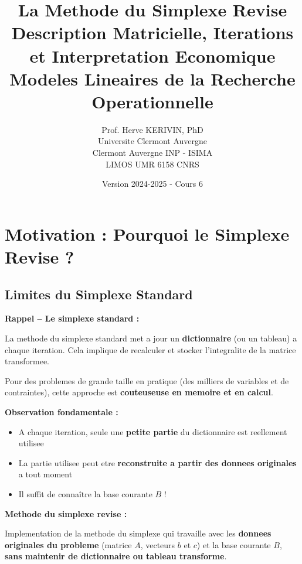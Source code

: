\documentclass[12pt,a4paper]{article}
\title{\textbf{\Huge\color{titrebleu}La Methode du Simplexe Revise}\\[0.5em]
\large\color{defvert}Description Matricielle, Iterations et Interpretation Economique\\
\small Modeles Lineaires de la Recherche Operationnelle}
\author{\large Prof. Herve KERIVIN, PhD\\
\small Universite Clermont Auvergne\\
Clermont Auvergne INP - ISIMA\\
LIMOS UMR 6158 CNRS}
\date{\large Version 2024-2025 - Cours 6}
\begin{document}
\maketitle
\tableofcontents
\newpage

\section{Motivation : Pourquoi le Simplexe Revise ?}

\subsection{Limites du Simplexe Standard}

\begin{notecours}
\textbf{Rappel -- Le simplexe standard :}

La methode du simplexe standard met a jour un \textcolor{titrebleu}{\textbf{dictionnaire}} (ou un tableau) a chaque iteration. Cela implique de recalculer et stocker l'integralite de la matrice transformee.

Pour des problemes de grande taille en pratique (des milliers de variables et de contraintes), cette approche est \textcolor{importantrouge}{\textbf{couteuseuse en memoire et en calcul}}.
\end{notecours}

\begin{astuce}
\textbf{Observation fondamentale :}

\begin{itemize}
    \item A chaque iteration, seule une \textcolor{defvert}{\textbf{petite partie}} du dictionnaire est reellement utilisee
    \item La partie utilisee peut etre \textcolor{titrebleu}{\textbf{reconstruite a partir des donnees originales}} a tout moment
    \item Il suffit de connaître la base courante $B$ !
\end{itemize}
\end{astuce}

\begin{definition}
\textbf{Methode du simplexe revise :}

Implementation de la methode du simplexe qui travaille avec les \textcolor{defvert}{\textbf{donnees originales du probleme}} (matrice $A$, vecteurs $b$ et $c$) et la base courante $B$, \textcolor{importantrouge}{\textbf{sans maintenir de dictionnaire ou tableau transforme}}.
\end{definition}
\end{document}
